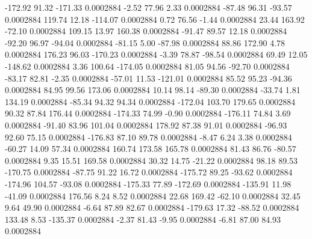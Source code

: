      -172.92       91.32     -171.33     0.0002884
       -2.52       77.96        2.33     0.0002884
      -87.48       96.31      -93.57     0.0002884
      119.74       12.18     -114.07     0.0002884
        0.72       76.56       -1.44     0.0002884
       23.44      163.92      -72.10     0.0002884
      109.15       13.97      160.38     0.0002884
      -91.47       89.57       12.18     0.0002884
      -92.20       96.97      -94.04     0.0002884
      -81.15        5.00      -87.98     0.0002884
       88.86      172.90        4.78     0.0002884
      176.23       96.03     -170.23     0.0002884
       -3.39       78.87      -98.54     0.0002884
       69.49       12.05     -148.62     0.0002884
        3.36      100.64     -174.05     0.0002884
       81.05       94.56      -92.70     0.0002884
      -83.17       82.81       -2.35     0.0002884
      -57.01       11.53     -121.01     0.0002884
       85.52       95.23      -94.36     0.0002884
       84.95       99.56      173.06     0.0002884
       10.14       98.14      -89.30     0.0002884
      -33.74        1.81      134.19     0.0002884
      -85.34       94.32       94.34     0.0002884
     -172.04      103.70      179.65     0.0002884
       90.32       87.84      176.44     0.0002884
     -174.33       74.99       -0.90     0.0002884
     -176.11       74.84        3.69     0.0002884
      -91.40       83.96      101.04     0.0002884
      178.92       87.38       91.01     0.0002884
      -96.93       92.60       75.15     0.0002884
     -176.83       87.10       89.78     0.0002884
       -8.47        6.24        3.38     0.0002884
      -60.27       14.09       57.34     0.0002884
      160.74      173.58      165.78     0.0002884
       81.43       86.76      -80.57     0.0002884
        9.35       15.51      169.58     0.0002884
       30.32       14.75      -21.22     0.0002884
       98.18       89.53     -170.75     0.0002884
      -87.75       91.22       16.72     0.0002884
     -175.72       89.25      -93.62     0.0002884
     -174.96      104.57      -93.08     0.0002884
     -175.33       77.89     -172.69     0.0002884
     -135.91       11.98      -41.09     0.0002884
      176.56        8.24        8.52     0.0002884
       22.68      169.42      -62.10     0.0002884
       32.45        9.64       49.90     0.0002884
       -6.64       87.89       82.67     0.0002884
     -179.63       17.32      -88.52     0.0002884
      133.48        8.53     -135.37     0.0002884
       -2.37       81.43       -9.95     0.0002884
       -6.81       87.00       84.93     0.0002884
